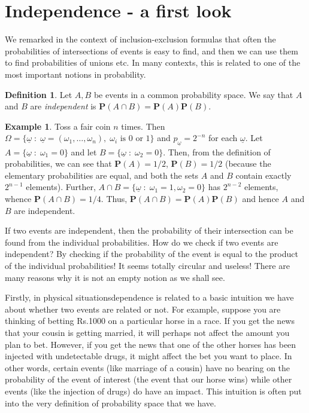 \documentclass[preprint,  11pt]{amsart}
\def\ome{\omega}
\theoremstyle{plain} %
\theoremstyle{definition} %
\newtheorem{definition}[theorem]{Definition}
\newtheorem{example}[theorem]{Example}
\begin{document}
\section{Independence - a first look}
We remarked in the context of inclusion-exclusion formulas that often the probabilities of intersections of events is easy to find, and then we can use them to find probabilities of unions etc. In many contexts, this is related to one of the most important notions in probability.

\begin{definition} Let $A,B$ be events in a common probability space. We say that $A$ and $B$ are {\em independent} is $\mathbf{P}(A\cap B)=\mathbf{P}(A)\mathbf{P}(B)$.
\end{definition}
\begin{example} Toss a fair coin $n$ times. Then $\Omega=\{\underline{\ome}{\; : \;} \underline{\ome}=(\omega_{1},\ldots ,\omega_{n}), \; \omega_{i}\mbox{ is }0\mbox{ or }1\}$ and $p_{\underline{\ome}}=2^{-n}$ for each $\underline{\ome}$. Let $A=\{\underline{\ome}{\; : \;} \omega_{1}=0\}$ and let $B=\{\underline{\ome}{\; : \;} \omega_{2}=0\}$. Then, from the definition of probabilities, we can see that $\mathbf{P}(A)=1/2$, $\mathbf{P}(B)=1/2$ (because the elementary probabilities are equal, and both the sets $A$ and $B$ contain exactly $2^{n-1}$ elements). Further, $A\cap B=\{\underline{\ome}{\; : \;} \omega_{1}=1, \omega_{2}=0\}$ has $2^{n-2}$ elements, whence $\mathbf{P}(A\cap B)=1/4$. Thus, $\mathbf{P}(A\cap B)=\mathbf{P}(A)\mathbf{P}(B)$ and hence $A$ and $B$ are independent. 
\end{example}
If two events are independent, then the probability of their intersection can be found from the individual probabilities. How do we check if two events are independent? By checking if the probability of the event is equal to the product of the individual probabilities! It seems totally circular and useless! There are many reasons why it is not an empty notion as we shall see. 

Firstly, in physical situationsdependence is related to a basic intuition we have about whether two events are related or not. For example, suppose you are thinking of betting Rs.1000 on a particular horse in a race. If you get the news that your cousin is getting married, it will perhaps not affect the amount you plan to bet. However, if you get the news that one of the other horses has been injected with undetectable drugs, it might affect the bet you want to place. In other words, certain events (like marriage of a cousin) have no bearing on the probability of the event of interest (the event that our horse wins) while other events (like the injection of drugs) do have an impact. This intuition is often put into the very definition of probability space that we have. 
\end{document}
